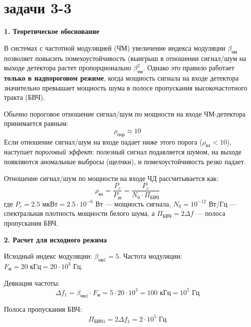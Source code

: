\section{задачи 3-3}

\vspace{1em}
\textbf{1. Теоретическое обоснование}

В системах с частотной модуляцией (ЧМ) увеличение индекса модуляции $\beta_{\text{чм}}$ позволяет повысить помехоустойчивость (выигрыш в отношении сигнал/шум на выходе детектора растет пропорционально $\beta_{\text{чм}}^2$. Однако это правило работает \textbf{только в надпороговом режиме}, когда мощность сигнала на входе детектора значительно превышает мощность шума в полосе пропускания высокочастотного тракта (БВЧ). 

Обычно пороговое отношение сигнал/шум по мощности на входе ЧМ-детектора принимается равным:
\begin{equation*}
    \rho_{\text{пор}} \approx 10
\end{equation*}
Если отношение сигнал/шум на входе падает ниже этого порога ($\rho_{\text{вх}} < 10$), наступает \textit{пороговый эффект}: полезный сигнал подавляется шумом, на выходе появляются аномальные выбросы (щелчки), и помехоустойчивость резко падает.

Отношение сигнал/шум по мощности на входе ЧД рассчитывается как:
\begin{equation*}
    \rho_{\text{вх}} = \frac{P_c}{P_{\text{ш}}} = \frac{P_c}{N_0 \cdot \Pi_{\text{БВЧ}}}
\end{equation*}
где $P_c = 2.5 \text{ мкВт} = 2.5 \cdot 10^{-6} \text{ Вт}$ — мощность сигнала, $N_0 = 10^{-12} \text{ Вт/Гц}$ — спектральная плотность мощности белого шума, а $\Pi_{\text{БВЧ}} = 2\Delta f$ — полоса пропускания БВЧ.

\vspace{1em}
\textbf{2. Расчет для исходного режима}

Исходный индекс модуляции: $\beta_{\text{чм1}} = 5$.
Частота модуляции: $F_{\text{м}} = 20 \text{ кГц} = 20 \cdot 10^3 \text{ Гц}$.

Девиация частоты:
\begin{equation*}
    \Delta f_1 = \beta_{\text{чм1}} \cdot F_{\text{м}} = 5 \cdot 20 \cdot 10^3 = 100 \text{ кГц} = 10^5 \text{ Гц}
\end{equation*}

Полоса пропускания БВЧ:
\begin{equation*}
    \Pi_{\text{БВЧ1}} = 2\Delta f_1 = 2 \cdot 10^5 \text{ Гц}
\end{equation*}

